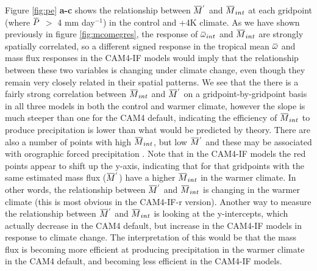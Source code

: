 \documentclass[letterpaper,12pt,titlepage,oneside,final]{book}
\newcommand{\overbar}[1]{\mkern 1.5mu\overline{\mkern-1.5mu#1\mkern-1.5mu}\mkern 1.5mu}
\begin{document}
Figure \ref{fig:pe} \textbf{a-c} shows the relationship between $\overbar{M}^{'}$ and $\overbar{M}_{int}$ at each gridpoint (where $\overbar{P}$ $>$ 4 mm day$^{-1}$) in the control and +4K climate. As we have shown previously in figure \ref{fig:mcomegres}, the response of $\overbar{\omega}_{int}$ and $\overbar{M}_{int}$ are strongly spatially correlated, so a different signed response in the tropical mean $\overbar{\omega}$ and mass flux responses in the CAM4-IF models would imply that the relationship between these two variables is changing under climate change, even though they remain very closely related in their spatial patterns. We see that the there is a fairly strong correlation between $\overbar{M}_{int}$ and $\overbar{M}^{'}$  on a gridpoint-by-gridpoint basis in all three models in both the control and warmer climate, however the slope is much steeper than one for the CAM4 default, indicating the efficiency of $\overbar{M}_{int}$ to produce precipitation is lower than what would be predicted by theory. There are also a number of points with high $\overbar{M}_{int}$, but low $\overbar{M}^{'}$ and these may be associated with orographic forced precipitation \citep{chadwick_spatial_2012}. Note that in the CAM4-IF models the red points appear to shift up the y-axis, indicating that for that gridpoints with the same estimated mass flux ($\overbar{M}^{'}$) have a higher $\overbar{M}_{int}$ in the warmer climate. In other words, the relationship between $\overbar{M}^{'}$ and $\overbar{M}_{int}$ is changing in the warmer climate (this is most obvious in the CAM4-IF-r version). Another way to measure the relationship between $\overbar{M}^{'}$ and $\overbar{M}_{int}$ is looking at the y-intercepts, which actually decrease in the CAM4 default, but increase in the CAM4-IF models in response to climate change. The interpretation of this would be that the mass flux is becoming more efficient at producing precipitation in the warmer climate in the CAM4 default, and becoming less efficient in the CAM4-IF models.
\end{document}
